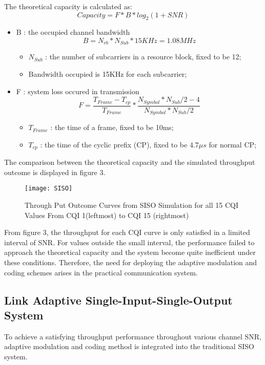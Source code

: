 \documentclass[journal,comsoc]{IEEEtran}
\begin{document}
The theoretical capacity is calculated as:
\[Capacity= F * B * log_2(1 + SNR)\]
\begin{itemize}
  \item B : the occupied channel bandwidth  \[B = N_{rb} * N_{Sub} * 15KHz = 1.08MHz\]
  \begin{itemize}
  \item \(N_{Sub}\) : the number of subcarriers in a resource block, fixed to be 12;
  \item Bandwidth occupied is 15KHz for each subcarrier;
  \end{itemize}
  \item F : system loss occured in transmission
  \[F = \frac{T_{Frame}-T_{cp}}{T_{Frame}}*\frac{N_{Symbol}*N_{Sub}/2-4}{N_{Symbol}*N_{Sub}/2}\]
  \begin{itemize}
  \item \(T_{Frame}\) : the time of a frame, fixed to be 10ms;
  \item \(T_{cp}\) : the time of the cyclic prefix (CP), fixed to be 4.7$\mu s$ for normal CP;
  \end{itemize}
\end{itemize}
The comparison between the theoretical capacity and the simulated throughput outcome is displayed in figure 3.
\begin{figure}[!h]
    \centering
    \captionsetup{justification=centering}
    \label{fig_parabola}
	\texttt{[image: SISO]}
	\centering
	\caption{Through Put Outcome Curves from SISO Simulation for all 15 CQI Values
From CQI 1(leftmost) to CQI 15 (rightmost)}
\end{figure}

From figure 3, the throughput for each CQI curve is only satisfied in a limited interval of SNR. For values outside the small interval, the performance failed to approach the theoretical capacity and the system become quite inefficient under these conditions. Therefore, the need for deploying the adaptive modulation and coding schemes arises in the practical communication system.



\subsection{Link Adaptive Single-Input-Single-Output System}
To achieve a satisfying throughput performance throughout various channel SNR, adaptive modulation and coding method is integrated into the traditional SISO system.
\end{document}

